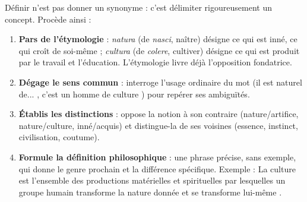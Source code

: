\documentclass[11pt]{article}
\begin{document}
\begin{methode}
Définir n'est pas donner un synonyme : c'est délimiter rigoureusement un concept. Procède ainsi :
\begin{enumerate}
\item \textbf{Pars de l'étymologie} : \emph{natura} (de \emph{nasci}, naître) désigne ce qui est inné, ce qui croît de soi-même ; \emph{cultura} (de \emph{colere}, cultiver) désigne ce qui est produit par le travail et l'éducation. L'étymologie livre déjà l'opposition fondatrice.
\item \textbf{Dégage le sens commun} : interroge l'usage ordinaire du mot (\guillemotleft il est naturel de... \guillemotright, \guillemotleft c'est un homme de culture \guillemotright) pour repérer ses ambiguïtés.
\item \textbf{Établis les distinctions} : oppose la notion à son contraire (nature/artifice, nature/culture, inné/acquis) et distingue-la de ses voisines (essence, instinct, civilisation, coutume).
\item \textbf{Formule la définition philosophique} : une phrase précise, sans exemple, qui donne le genre prochain et la différence spécifique. Exemple : \guillemotleft La culture est l'ensemble des productions matérielles et spirituelles par lesquelles un groupe humain transforme la nature donnée et se transforme lui-même \guillemotright.
\end{enumerate}
\end{methode}
\end{document}
